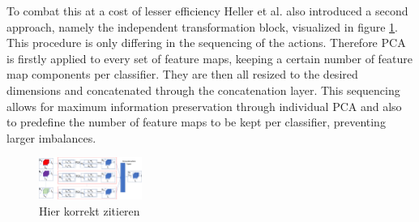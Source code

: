 To combat this at a cost of lesser efficiency Heller et al. also introduced a second approach, namely the independent transformation block, 
visualized in figure \ref{fig:ITBheller}. 
This procedure is only differing in the sequencing of the actions. Therefore PCA is firstly applied to every set of feature maps, keeping 
a certain number of feature map components per classifier. They are then all resized to the desired dimensions and concatenated through 
the concatenation layer. This sequencing allows for maximum information preservation through individual PCA and also to predefine the number 
of feature maps to be kept per classifier, preventing larger imbalances.

\begin{figure}[ht]
    \centering
    \includegraphics[width=0.3\textwidth]{figures/independent_transformation_block.jpg}
    \caption{Hier korrekt zitieren}
    \label{fig:ITBheller}
\end{figure}


